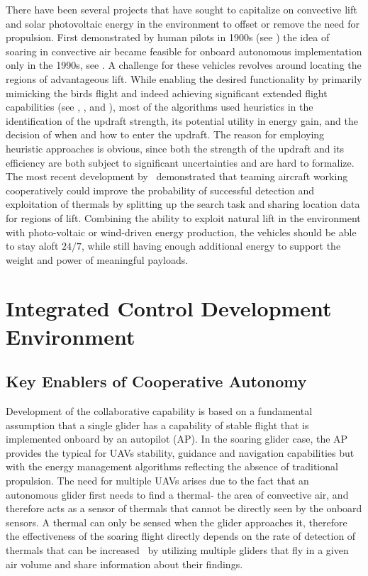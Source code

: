 \documentclass[letterpaper, 10 pt, conference]{ieeeconf}  %
\begin{document}
There have been several projects that have sought to capitalize on convective lift and solar photovoltaic energy in the environment to offset or remove the need for propulsion. First demonstrated by human pilots in 1900s (see \cite{Simons:1998}) the idea of soaring in convective air became feasible for onboard autonomous implementation only in the 1990s, see \cite{Wharington:1998}. A challenge for these vehicles revolves around locating the regions of advantageous lift. While enabling the desired functionality by primarily mimicking the birds flight and indeed achieving significant extended flight capabilities (see \cite{Edwards:2008}, \cite{Allen:2006}, and \cite{Allen:2007}), most of the algorithms used heuristics in the identification of the updraft strength, its potential utility in energy gain, and the decision of when and how to enter the updraft. The reason for employing heuristic approaches is obvious, since both the strength of the updraft and its efficiency are both subject to significant uncertainties and are hard to formalize. The most recent development by~\cite{AKlass_CDC:2012,AKlass_JGCD:2012} demonstrated that teaming aircraft working cooperatively could improve the probability of successful detection and exploitation of thermals by splitting up the search task and sharing location data for regions of lift. Combining the ability to exploit natural lift in the environment with photo-voltaic or wind-driven energy production, the vehicles should be able to stay aloft $24/7$, while still having enough additional energy to support the weight and power of meaningful payloads.


\section{Integrated Control Development Environment}

\subsection{Key Enablers of Cooperative Autonomy}
Development of the collaborative capability is based on a fundamental assumption that a single glider has a capability of stable flight that is implemented onboard by an autopilot (AP). In the soaring glider case, the AP provides the typical for UAVs stability, guidance and navigation capabilities but with the energy management algorithms reflecting the absence of traditional propulsion. The need for multiple UAVs arises due to the fact that an autonomous glider first needs to find a thermal- the area of convective air, and therefore acts as a sensor of thermals that cannot be directly seen by the onboard sensors. A thermal can only be sensed when the glider approaches it, therefore the effectiveness of the soaring flight directly depends on the rate of detection of thermals that can be increased~\cite{AKlass_JGCD:2012} by utilizing multiple gliders that fly in a given air volume and share information about their findings.
\end{document}

